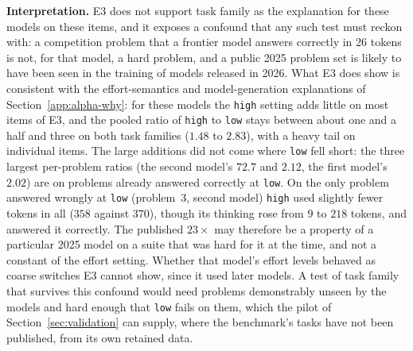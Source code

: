 \documentclass[11pt]{article}
\begin{document}
\textbf{Interpretation.} E3 does not support task family as the explanation for these
models on these items, and it exposes a confound that any such test must reckon with: a
competition problem that a frontier model answers correctly in 26 tokens is not, for that
model, a hard problem, and a public 2025 problem set is likely to have been seen in the
training of models released in 2026. What E3 does show is consistent with the
effort-semantics and model-generation explanations of Section~\ref{app:alpha-why}: for
these models the \texttt{high} setting adds little on most items of E3, and the pooled ratio of \texttt{high} to \texttt{low} stays
between about one and a half and three on both task families ($1.48$ to $2.83$), with a heavy tail on individual
items. The large additions did not come where \texttt{low} fell short: the three largest per-problem
ratios (the second model's $72.7$ and $2.12$, the first model's $2.02$) are on problems already
answered correctly at \texttt{low}. On the only problem answered wrongly at \texttt{low} (problem~3,
second model) \texttt{high} used slightly fewer tokens in all ($358$ against $370$), though its thinking rose from $9$ to $218$ tokens, and answered it correctly. The published $23\times$ may therefore be a property of a particular 2025
model on a suite that was hard for it at the time, and not a constant of the effort setting. Whether that model's effort levels behaved as coarse switches E3 cannot show, since it used later models. A test of task family that survives
this confound would need problems demonstrably unseen by the models and hard enough that
\texttt{low} fails on them, which the pilot of Section~\ref{sec:validation} can supply, where the benchmark's tasks have not been published,
from its own retained data.



\end{document}
